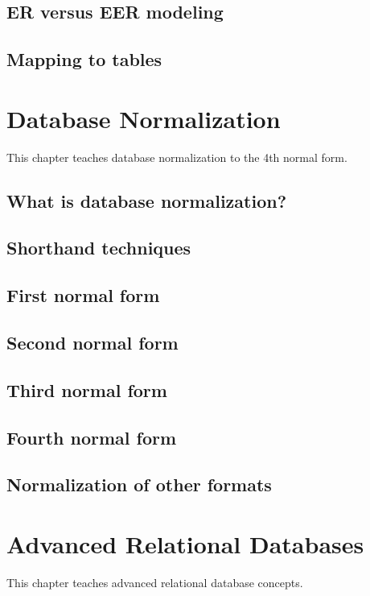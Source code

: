 \section{ER versus EER modeling}
\section{Mapping to tables}

\chapter{Database Normalization}
\label{chap:relational:database-normalization}
This chapter teaches database normalization to the 4th normal form.

\section{What is database normalization?}
\section{Shorthand techniques}
\section{First normal form}
\section{Second normal form}
\section{Third normal form}
\section{Fourth normal form}
\section{Normalization of other formats}

\chapter{Advanced Relational Databases}
\label{chap:relational:advanced-relational-databases}
This chapter teaches advanced relational database concepts.

